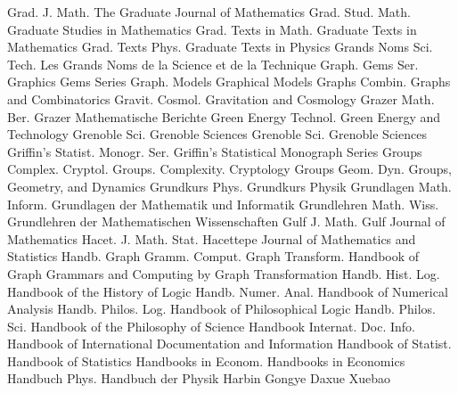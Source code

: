 {Grad. J. Math.}
{The Graduate Journal of Mathematics}
{Grad. Stud. Math.}
{Graduate Studies in Mathematics}
{Grad. Texts in Math.}
{Graduate Texts in Mathematics}
{Grad. Texts Phys.}
{Graduate Texts in Physics}
{Grands Noms Sci. Tech.}
{Les Grands Noms de la Science et de la Technique}
{Graph. Gems Ser.}
{Graphics Gems Series}
{Graph. Models}
{Graphical Models}
{Graphs Combin.}
{Graphs and Combinatorics}
{Gravit. Cosmol.}
{Gravitation and Cosmology}
{Grazer Math. Ber.}
{Grazer Mathematische Berichte}
{Green Energy Technol.}
{Green Energy and Technology}
{Grenoble Sci.}
{Grenoble Sciences}
{Grenoble Sci.}
{Grenoble Sciences}
{Griffin's Statist. Monogr. Ser.}
{Griffin's Statistical Monograph Series}
{Groups Complex. Cryptol.}
{Groups. Complexity. Cryptology}
{Groups Geom. Dyn.}
{Groups, Geometry, and Dynamics}
{Grundkurs Phys.}
{Grundkurs Physik}
{Grundlagen Math. Inform.}
{Grundlagen der Mathematik und Informatik}
{Grundlehren Math. Wiss.}
{Grundlehren der Mathematischen Wissenschaften}
{Gulf J. Math.}
{Gulf Journal of Mathematics}
{Hacet. J. Math. Stat.}
{Hacettepe Journal of Mathematics and Statistics}
{Handb. Graph Gramm. Comput. Graph Transform.}
{Handbook of Graph Grammars and Computing by Graph Transformation}
{Handb. Hist. Log.}
{Handbook of the History of Logic}
{Handb. Numer. Anal.}
{Handbook of Numerical Analysis}
{Handb. Philos. Log.}
{Handbook of Philosophical Logic}
{Handb. Philos. Sci.}
{Handbook of the Philosophy of Science}
{Handbook Internat. Doc. Info.}
{Handbook of International Documentation and Information}
{Handbook of Statist.}
{Handbook of Statistics}
{Handbooks in Econom.}
{Handbooks in Economics}
{Handbuch Phys.}
{Handbuch der Physik}
{Harbin Gongye Daxue Xuebao}
